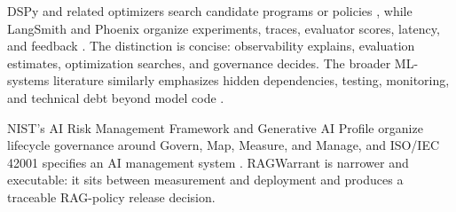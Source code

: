 \documentclass[11pt]{article}
\begin{document}
DSPy and related optimizers search candidate programs or policies
\cite{khattab2023dspy}, while LangSmith and Phoenix organize experiments, traces,
evaluator scores, latency, and feedback \cite{langsmith2026,phoenix2026}. The distinction is
concise: observability explains, evaluation estimates, optimization
searches, and governance decides. The broader ML-systems literature
similarly emphasizes hidden dependencies, testing, monitoring, and
technical debt beyond model code \cite{sculley2015debt,breck2017mltest}.

NIST's AI Risk Management Framework and Generative AI
Profile organize lifecycle governance around Govern, Map, Measure, and
Manage, and ISO/IEC 42001 specifies an AI management system \cite{tabassi2023nist,autio2024genai,iso42001}.
RAGWarrant is narrower and executable: it sits between measurement and
deployment and produces a traceable RAG-policy release decision.
\end{document}
